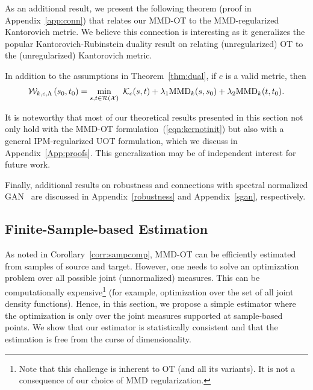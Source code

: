 \begin{remark}\label{connection}
    As an additional result, we present the following theorem (proof in Appendix~\ref{app:conn}) that relates our MMD-OT to the MMD-regularized Kantorovich metric. We believe this connection is interesting as it generalizes the popular Kantorovich-Rubinstein duality result on relating (unregularized) OT to the (unregularized) Kantorovich metric.
\begin{theoremBox}
    \begin{theorem}\label{thm:connkant}
In addition to the assumptions in Theorem~\ref{thm:dual}, if $c$ is a valid metric, then
\begin{equation}\label{eqn:ipmkantker}
    \mathcal{W}_{k, c, \Lambda}\left(s_0,t_0\right) =\min\limits_{s,t\in\mathcal{R}(\mathcal{X})}\  \mathcal{K}_c(s,t) + \lambda_1 \textup{MMD}_k(s,s_0) + \lambda_2 \textup{MMD}_k(t,t_0).
\end{equation}
\end{theorem}
\end{theoremBox}
    
\end{remark}
\begin{remark}\label{ipm-remark}
    It is noteworthy that most of our theoretical results presented in this section not only hold with the MMD-OT formulation~(\ref{eqn:kernotinit}) but also with a general IPM-regularized UOT formulation, which we discuss in Appendix~\ref{App:proofs}. This generalization may be of independent interest for future work.
\end{remark}
Finally, additional results on robustness and connections with spectral normalized GAN~\citep{sngan} are discussed in Appendix~\ref{robustness} and Appendix~\ref{sgan}, respectively.

\subsection{Finite-Sample-based Estimation} 
As noted in Corollary~\ref{corr:sampcomp}, MMD-OT can be efficiently estimated from samples of source and target. However, one needs to solve an optimization problem over all possible joint (unnormalized) measures. This can be computationally expensive\footnote{Note that this challenge is inherent to OT (and all its variants). It is not a consequence of our choice of MMD regularization.} (for example, optimization over the set of all joint density functions). Hence, in this section, we propose a simple estimator where the optimization is only over the joint measures supported at sample-based points. We show that our estimator is statistically consistent and that the estimation is free from the curse of dimensionality.

